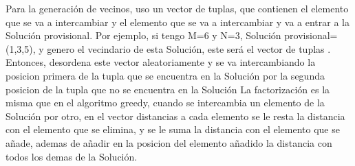 \documentclass{article}
\begin{document}
\newline Para la generación de vecinos, uso un vector de tuplas, que contienen el elemento que se 
va a intercambiar y el elemento que se va a intercambiar y va a entrar a la Solución provisional.
\newline Por ejemplo, si tengo {M}=6 y {N}=3, Solución provisional=(1,3,5), y genero el vecindario de esta Solución, 
este será el vector de tuplas .
\newline Entonces, desordena este vector aleatoriamente y se va intercambiando la posicion primera 
de la tupla que se encuentra en la Solución por la segunda posicion de la tupla que no se encuentra en la Solución
\newline La factorización es la misma que en el algoritmo greedy, cuando se intercambia un elemento de la Solución 
por otro, en el vector distancias a cada elemento se le resta la distancia con el elemento que se elimina, 
y se le suma la distancia con el elemento que se añade, ademas de añadir en la posicion del elemento añadido 
la distancia con todos los demas de la Solución.
\end{document}
